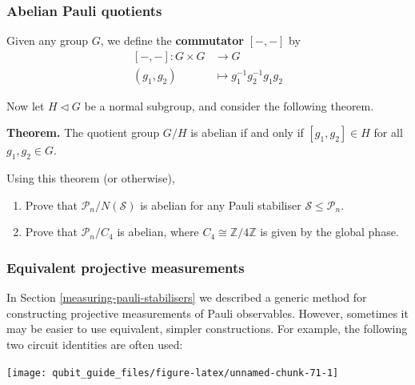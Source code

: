 \documentclass[fleqn,a4paper]{article}
\providecommand{\tightlist}{\setlength{\itemsep}{0pt}\setlength{\parskip}{0pt}}
\newenvironment{idea}{\everypar{\setlength{\parindent}{1.5em}}}{}
\theoremstyle{definition}
\theoremstyle{definition}
\theoremstyle{definition}
\theoremstyle{definition}
\theoremstyle{remark}
\begin{document}
\hypertarget{pauli-mod-normaliser-is-abelian}{%
\subsubsection{Abelian Pauli quotients}\label{pauli-mod-normaliser-is-abelian}}

Given any group \(G\), we define the \textbf{commutator} \([-,-]\) by
\[
  \begin{aligned}
    [-,-]\colon G\times G
    &\longrightarrow G
  \\(g_1,g_2)
    &\longmapsto g_1^{-1}g_2^{-1}g_1g_2
  \end{aligned}
\]

Now let \(H\triangleleft G\) be a normal subgroup, and consider the following theorem.

\begin{idea}
\textbf{Theorem.} The quotient group \(G/H\) is abelian if and only if \([g_1,g_2]\in H\) for all \(g_1,g_2\in G\).

\end{idea}

Using this theorem (or otherwise),

\begin{enumerate}
\def\labelenumi{\arabic{enumi}.}
\tightlist
\item
  Prove that \(\mathcal{P}_n/N(\mathcal{S})\) is abelian for any Pauli stabiliser \(\mathcal{S}\leqslant\mathcal{P}_n\).
\item
  Prove that \(\mathcal{P}_n/C_4\) is abelian, where \(C_4\cong\mathbb{Z}/4\mathbb{Z}\) is given by the global phase.
\end{enumerate}

\hypertarget{equivalent-projective-pauli-measurements}{%
\subsubsection{Equivalent projective measurements}\label{equivalent-projective-pauli-measurements}}

In Section \ref{measuring-pauli-stabilisers} we described a generic method for constructing projective measurements of Pauli observables.
However, sometimes it may be easier to use equivalent, simpler constructions.
For example, the following two circuit identities are often used:

\begin{center}\texttt{[image: qubit\_guide\_files/figure-latex/unnamed-chunk-71-1]} \end{center}
\end{document}
